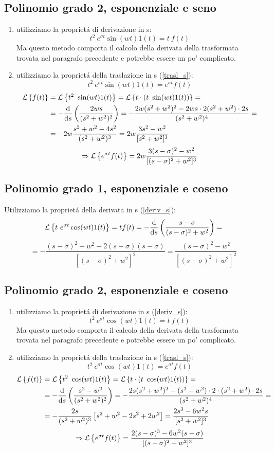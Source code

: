 \documentclass[../main.tex]{subfiles}
\begin{document}
	\subsection{Polinomio grado 2, esponenziale e seno}
	\begin{enumerate}
		\item utilizziamo la propriet\'{a} di derivazione in s:
		$$ t^2\ e^{\sigma t} \sin(wt) 1(t) = t\ f(t) $$
		Ma questo metodo comporta il calcolo della derivata della trasformata trovata nel paragrafo precedente e potrebbe essere un po' complicato.
		\item utilizziamo la propriet\'{a} della traslazione in s (\ref{trasl_s}):
		$$ t^2\ e^{\sigma t} \sin(wt) 1(t) = e^{\sigma t} f(t) $$
		\begin{align*}
		\mathcal{L} \left\lbrace f(t) \right\rbrace &= \mathcal{L} \left\lbrace t^2\ \sin(wt) 1(t) \right\rbrace = \mathcal{L} \left\lbrace t \cdot (t\ \sin(wt) 1(t)) \right\rbrace =\\
		&= -\frac{\mathrm{d} }{\mathrm{d} s} \left( \frac{2ws}{(s^2+w^2)^2} \right) = -\frac{2w(s^2+w^2)^2-2ws \cdot 2(s^2+w^2) \cdot 2s}{(s^2+w^2)^4} =\\ 
		&= -2w \frac{s^2+w^2-4s^2}{(s^2+w^2)^3} = 2w \frac{3s^2-w^2}{[s^2+w^2]^3}
		\end{align*}
		$$ \Rightarrow \mathcal{L} \left\lbrace e^{\sigma t} f(t) \right\rbrace = 2w \frac{3(s-\sigma)^2 - w^2}{[(s-\sigma)^2+w^2]^3} $$
	\end{enumerate}
	\subsection{Polinomio grado 1, esponenziale e coseno}
	Utilizziamo la propriet\'{a} della derivata in s (\ref{deriv_s}):
	\[
	 	\mathcal{L} \left\lbrace t\ e^{\sigma t} \cos(wt) 1(t) \right\rbrace = t f(t) = -\frac{\mathrm{d} }{\mathrm{d} s} \left( \frac{s-\sigma}{(s-\sigma)^2+w^2} \right) =
	 \]
	 \[	
	 	=-\frac{(s-\sigma)^2+w^2-2(s-\sigma)(s-\sigma)}{[(s-\sigma)^2+w^2]^2} = \frac{(s-\sigma)^2-w^2}{[(s-\sigma)^2+w^2]^2}
	 \]
	\subsection{Polinomio grado 2, esponenziale e coseno}
	\begin{enumerate}
		\item utilizziamo la propriet\'{a} di derivazione in s (\ref{deriv_s}):
		$$ t^2\ e^{\sigma t} \cos(wt) 1(t) = t\ f(t) $$
		Ma questo metodo comporta il calcolo della derivata della trasformata trovata nel paragrafo precedente e potrebbe essere un po' complicato.
		\item utilizziamo la propriet\'{a} della traslazione in s (\ref{trasl_s}):
		$$ t^2\ e^{\sigma t} \cos(wt) 1(t) = e^{\sigma t} f(t) $$
		\begin{align*}
		\mathcal{L} \left\lbrace f(t) \right\rbrace &= \mathcal{L} \left\lbrace t^2\ \cos(wt) 1(t) \right\rbrace = \mathcal{L} \left\lbrace t \cdot (t\ \cos(wt) 1(t)) \right\rbrace =\\
		&= -\frac{\mathrm{d} }{\mathrm{d} s} \left( \frac{s^2-w^2}{(s^2+w^2)^2} \right) = -\frac{2s(s^2+w^2)^2 - (s^2-w^2) \cdot 2 \cdot (s^2+w^2) \cdot 2s}{(s^2+w^2)^4} =\\ 
		&= -\frac{2s}{(s^2+w^2)^3} \left[ s^2+w^2-2s^2+2w^2 \right] = \frac{2s^3-6w^2s}{[s^2+w^2]^3}
		\end{align*}
		$$ \Rightarrow \mathcal{L} \left\lbrace e^{\sigma t} f(t) \right\rbrace = \frac{2(s-\sigma)^3-6w^2(s-\sigma)}{[(s-\sigma)^2+w^2]^3} $$
	\end{enumerate}
\end{document}
